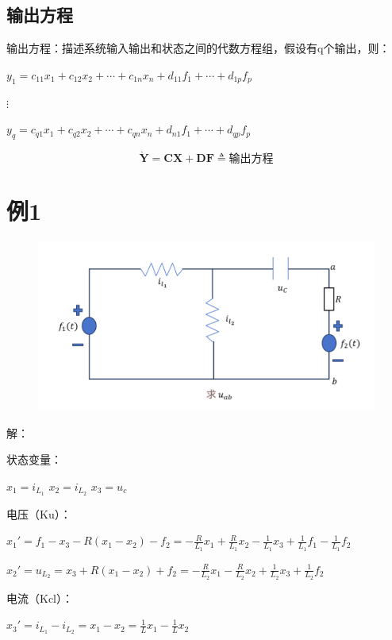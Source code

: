 \documentclass[UTF8]{ctexart}
\begin{document}
\subsection{输出方程}
输出方程：描述系统输入输出和状态之间的代数方程组，假设有q个输出，则： \par
$y_1=c_{11}x_1+c_{12}x_2+\cdots +c_{1n}x_n+d_{11}f_1+\cdots +d_{1p}f_p$ \par
$\vdots $ \par
$y_q=c_{q1}x_1+c_{q2}x_2+\cdots +c_{qn}x_n+d_{n1}f_1+\cdots +d_{qp}f_p$ \par
\begin{equation}
  \dot{\bm{Y}} = \bm{CX} + \bm{DF}\triangleq \text{输出方程}
  \nonumber
\end{equation}

\section{例1}
\begin{figure}[h]
  \centering         %
  \includegraphics[scale=0.38]{1.png}
\end{figure}
解： \par
状态变量： \par
$x_1=i_{L_1}$ \qquad $x_2=i_{L_2}$ \qquad $x_3=u_{c}$ \par 
电压（Ku）：\par
$ x_1'=f_1-x_3-R(x_1-x_2)-f_2=-\frac{R}{L_1} x_1+\frac{R}{L_1} x_2-\frac{1}{L_1} x_3+\frac{1}{L_1} f_1-\frac{1}{L_1} f_2 $\par 
$ x_2'=u_{L_2}=x_3+R(x_1-x_2)+f_2=-\frac{R}{L_2} x_1-\frac{R}{L_2} x_2+\frac{1}{L_2} x_3+\frac{1}{L_2} f_2 $\par
电流（Kcl）：\par
$ x_3'=i_{L_1}-i_{L_2}=x_1-x_2=\frac{1}{L} x_1-\frac{1}{L} x_2 $ \par
\end{document}
